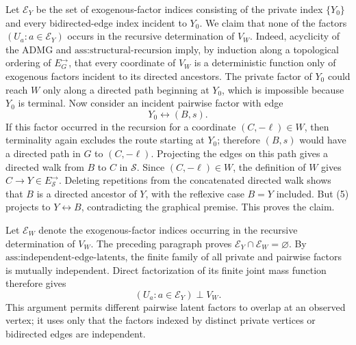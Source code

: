Let \(\mathcal E_Y\) be the set of exogenous-factor indices consisting of the private index \(\{Y_0\}\) and every bidirected-edge index incident to \(Y_0\). We claim that none of the factors \((U_a:a\in\mathcal E_Y)\) occurs in the recursive determination of \(V_W\). Indeed, acyclicity of the ADMG and \(\text{ass:structural-recursion}\) imply, by induction along a topological ordering of \(E_G^{\to}\), that every coordinate of \(V_W\) is a deterministic function only of exogenous factors incident to its directed ancestors. The private factor of \(Y_0\) could reach \(W\) only along a directed path beginning at \(Y_0\), which is impossible because \(Y_0\) is terminal. Now consider an incident pairwise factor with edge
\[
Y_0\leftrightarrow(B,s).
\tag{5}
\]
If this factor occurred in the recursion for a coordinate \((C,-\ell)\in W\), then terminality again excludes the route starting at \(Y_0\); therefore \((B,s)\) would have a directed path in \(G\) to \((C,-\ell)\). Projecting the edges on this path gives a directed walk from \(B\) to \(C\) in \(\mathcal S\). Since \((C,-\ell)\in W\), the definition of \(W\) gives \(C\to Y\in E_{\mathcal S}^{\to}\). Deleting repetitions from the concatenated directed walk shows that \(B\) is a directed ancestor of \(Y\), with the reflexive case \(B=Y\) included. But (5) projects to \(Y\leftrightarrow B\), contradicting the graphical premise. This proves the claim.

Let \(\mathcal E_W\) denote the exogenous-factor indices occurring in the recursive determination of \(V_W\). The preceding paragraph proves \(\mathcal E_Y\cap\mathcal E_W=\varnothing\). By \(\text{ass:independent-edge-latents}\), the finite family of all private and pairwise factors is mutually independent. Direct factorization of its finite joint mass function therefore gives
\[
(U_a:a\in\mathcal E_Y)\mathbin{\perp}V_W.
\tag{6}
\]
This argument permits different pairwise latent factors to overlap at an observed vertex; it uses only that the factors indexed by distinct private vertices or bidirected edges are independent.

